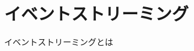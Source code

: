 \documentclass[../../../main]{subfiles}
\begin{document}
    \section{イベントストリーミング}\label{sec:phraseology-event_streaming}

    イベントストリーミングとは
\end{document}
